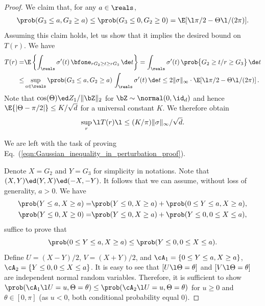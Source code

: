 \documentclass[11pt]{article}
\begin{document}
\begin{proof}
We claim that, for any $a\in\reals$,
%
\begin{align}\label{eqn:Gaussian_inequality_in_perturbation_proof}
\prob(G_3 \le a, G_2 \ge a) \le \prob(G_3 \le 0, G_2 \ge 0) = \E[\l \pi/2-\Theta\l /(2\pi)].
\end{align}
%
Assuming this claim holds, let us show that it implies the desired bound on $T(r)$. We have 
%
\begin{align*}
%
T(r) =& \E\left\{\int_\reals \sigma'(t) \, \bfone_{rG_2\ge t\ge rG_3}\, \de t\right\} =  \int_\reals \sigma'(t) \, \prob\big\{G_2\ge t/r\ge G_3\big\}\, \de t\\
\le & \sup_{a\in \reals} \prob(G_3 \le a, G_2 \ge a) \, \int_\reals \sigma'(t)\, \de t \le  2\|\sigma\|_{\infty} \cdot \E[\l \pi/2-\Theta\l /(2\pi)]\, .
\end{align*}
%
Note that $\cos(\Theta) \ed Z_1/\|\bZ\|_2$ for $\bZ\sim\normal(0,\id_d)$ and hence $\E\{|\Theta-\pi/2|\} \le K/\sqrt{d}$
for a universal constant $K$. We therefore obtain 
\begin{equation}
\sup_r \l T(r)\l \le (K / \pi) \|\sigma\|_{\infty}/\sqrt{d}.
\end{equation}

We are left with the task of proving Eq.~(\ref{eqn:Gaussian_inequality_in_perturbation_proof}).

Denote $X = G_2$ and $Y = G_3$ for simplicity in notations. Note that $(X, Y)\ed (Y, X)\ed (-X,-Y)$. It follows that we can assume, without loss of generality, $a > 0$. We have
%
\begin{align*}
\prob(Y \le a, X \ge a) =& \prob(Y \le 0, X \ge a) + \prob(0 \le Y \le a, X \ge a), \\
\prob(Y \le 0, X \ge 0) =& \prob(Y \le 0, X \ge a) + \prob(Y \le 0, 0 \le X \le a), 
\end{align*}
%
suffice to prove that
\[
\prob(0 \le Y \le a, X \ge a) \le \prob(Y \le 0, 0 \le X \le a). 
\]
%
Define $U = (X - Y)/2$, $V = (X + Y) /2$, and $\cA_1 = \{0 \le Y \le a, X \ge a\}$, $\cA_2 = \{Y \le 0, 0 \le X \le a\}$. It is easy to see that $[U \l \Theta = \theta]$ and $[V \l \Theta = \theta]$ are independent normal random variables. Therefore,
it is sufficient to show $\prob(\cA_1 \l U = u, \Theta = \theta) \le \prob(\cA_2 \l U = u, \Theta = \theta)$ for $u \ge 0$ and $\theta \in [0, \pi]$ (as $u < 0$, both conditional probability equal $0$). 


\end{proof}
\end{document}
